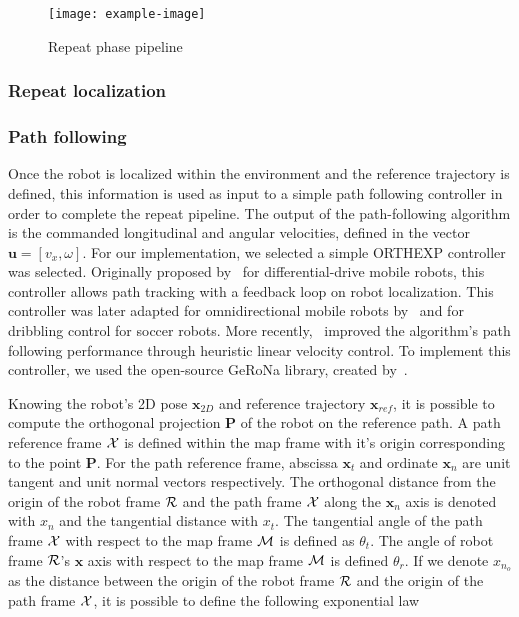 \lightlipsum[1]

\begin{figure} [htpb]
	\centering
	\texttt{[image: example-image]}
	\caption{Repeat phase pipeline}
	\label{fig:repeat_pipeline}
\end{figure}

\subsubsection{Repeat localization}
\label{sec:rep_loc}

\lightlipsum[1]

\subsubsection{Path following}
\label{sec:orthexp}

Once the robot is localized within the environment and the reference trajectory is defined, this information is used as input to a simple path following controller in order to complete the repeat pipeline.
The output of the path-following algorithm is the commanded longitudinal and angular velocities, defined in the vector $\bm u = [v_x, \omega]$.
For our implementation, we selected a simple \ac{ORTHEXP} controller was selected. 
Originally proposed by~\citet{Mojaev2004} for differential-drive mobile robots, this controller allows path tracking with a feedback loop on robot localization.
This controller was later adapted for omnidirectional mobile robots by~\citet{Li2007} and for dribbling control for soccer robots.
More recently,~\citet{Huskic2017} improved the algorithm's path following performance through heuristic linear velocity control.
To implement this controller, we used the open-source \ac{GeRoNa} library, created by~\citet{Huskic2019}.

Knowing the robot's 2D pose $\bm x_{2D}$ and reference trajectory $\bm x_{ref}$, it is possible to compute the orthogonal projection $\bm P$ of the robot on the reference path.
A path reference frame $\mathcal{X}$ is defined within the map frame with it's origin corresponding to the point $\bm P$.
For the path reference frame, abscissa $\bm x_t$ and ordinate $\bm x_n$ are unit tangent and unit normal vectors respectively. 
The orthogonal distance from the origin of the robot frame $\mathcal{R}$ and the path frame $\mathcal{X}$ along the $\bm x_n$ axis is denoted with $x_n$ and the tangential distance with $x_t$.
The tangential angle of the path frame $\mathcal{X}$ with respect to the map frame $\mathcal{M}$ is defined as $\theta_t$.
The angle of robot frame $\mathcal{R}$'s $\bm x$ axis with respect to the map frame $\mathcal{M}$ is defined $\theta_r$.
If we denote $x_{n_o}$ as the distance between the origin of the robot frame $\mathcal{R}$ and the origin of the path frame $\mathcal{X}$, it is possible to define the following exponential law

